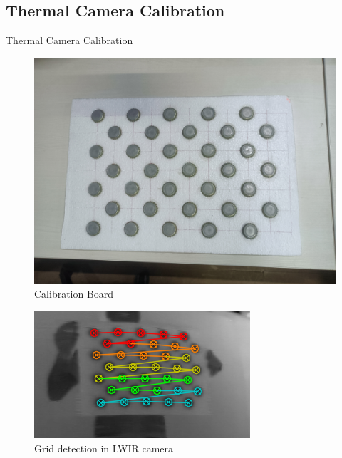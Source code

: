 \documentclass[10pt]{beamer}
\begin{document}
\subsection*{Thermal Camera Calibration}
\begin{frame}{Thermal Camera Calibration}
    \begin{minipage}{0.47\textwidth}

        \begin{figure}[h!]
            \centering
            \includegraphics[scale=0.03]{Calibration_board.jpg}
            \caption{Calibration Board}
            \label{fig: calib_board}
        \end{figure}

    \end{minipage}
    \begin{minipage}{0.47\textwidth}
        \vspace{0.2cm}
        \begin{figure}[h!]
            \centering
            \includegraphics[scale=0.5]{Corner_detected_thermal.png}
            \caption{Grid detection in LWIR camera}
            \label{fig: grid_detection}
        \end{figure}


\end{minipage}
\end{frame}
\end{document}
